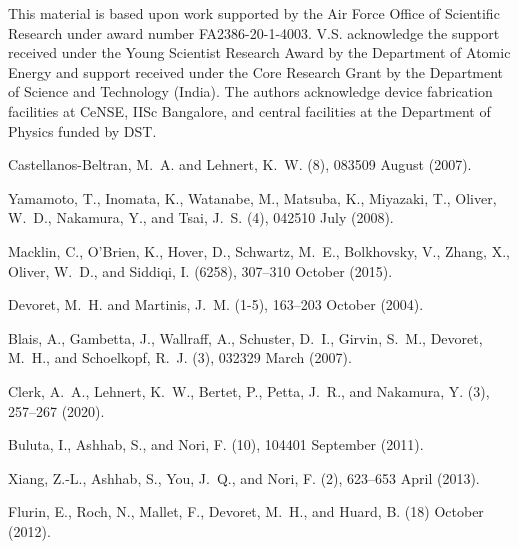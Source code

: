 \documentclass[a4paper, amsfonts, amssymb, amsmath, reprint,showkeys,nofootinbib,superscriptaddress]{revtex4-2}
\begin{document}
This material is based upon work supported by the Air Force Office of 
Scientific Research under award number FA2386-20-1-4003. V.S. acknowledge the 
support received under the Young Scientist Research Award by the Department of 
Atomic Energy and support received under the Core Research Grant by the Department of 
Science and Technology (India). The authors acknowledge device fabrication 
facilities at CeNSE, IISc
Bangalore, and central facilities at the Department of
Physics funded by DST.

\begin{thebibliography}{10}
	
	Castellanos-Beltran, M.~A. and Lehnert, K.~W.
	(8), 083509 August  (2007).
	
	Yamamoto, T., Inomata, K., Watanabe, M., Matsuba, K., Miyazaki, T., Oliver,
	W.~D., Nakamura, Y., and Tsai, J.~S.
	(4), 042510 July  (2008).
	
	Macklin, C., O’Brien, K., Hover, D., Schwartz, M.~E., Bolkhovsky, V., Zhang,
	X., Oliver, W.~D., and Siddiqi, I.
	(6258), 307--310 October  (2015).
	
	Devoret, M.~H. and Martinis, J.~M.
	(1-5), 163--203 October
	(2004).
	
	Blais, A., Gambetta, J., Wallraff, A., Schuster, D.~I., Girvin, S.~M., Devoret,
	M.~H., and Schoelkopf, R.~J.
	(3), 032329 March  (2007).
	
	Clerk, A.~A., Lehnert, K.~W., Bertet, P., Petta, J.~R., and Nakamura, Y.
	(3), 257--267 (2020).
	
	Buluta, I., Ashhab, S., and Nori, F.
	(10), 104401 September
	(2011).
	
	Xiang, Z.-L., Ashhab, S., You, J.~Q., and Nori, F.
	(2), 623--653 April  (2013).
	
	Flurin, E., Roch, N., Mallet, F., Devoret, M.~H., and Huard, B.
	(18) October  (2012).
	

\end{thebibliography}
\end{document}
